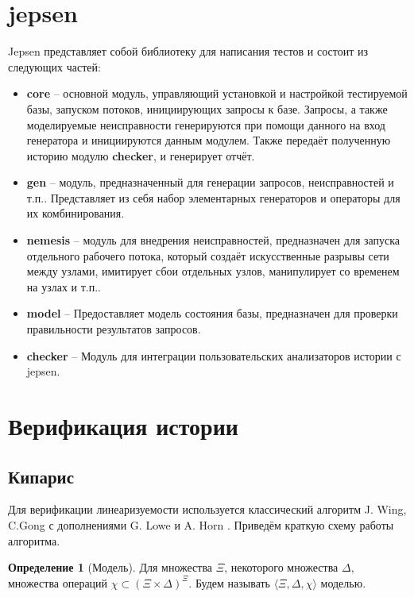 \documentclass[pdftex,ptm,14pt,a4paper]{extreport}
\theoremstyle{definition}
\newtheorem{definition}{Определение}[chapter]
\begin{document}
\section{jepsen}
Jepsen представляет собой библиотеку для написания тестов и состоит из следующих частей:
\begin{itemize}
    \item \textbf{core} -- основной модуль, управляющий установкой и настройкой тестируемой базы,
        запуском потоков, инициирующих запросы к базе. Запросы, а также моделируемые неисправности
        генерируются при помощи данного на вход  генератора и инициируются данным модулем.
        Также передаёт полученную историю модулю \textbf{checker}, и генерирует отчёт.
    \item \textbf{gen} -- модуль, предназначенный для генерации запросов, неисправностей и т.п..
        Представляет из себя набор элементарных генераторов и операторы для их комбинирования.
    \item \textbf{nemesis} -- модуль для внедрения неисправностей, предназначен для запуска
        отдельного рабочего потока, который создаёт искусственные разрывы сети между узлами,
        имитирует сбои отдельных узлов, манипулирует со временем на узлах и т.п..
    \item \textbf{model} -- Предоставляет модель состояния базы, предназначен для проверки правильности результатов запросов.
    \item \textbf{checker} -- Модуль для интеграции пользовательских анализаторов истории с jepsen.
\end{itemize}
\section{Верификация истории}
\subsection{Кипарис}
\label{cypress-verify}
Для верификации линеаризуемости используется классический алгоритм J. Wing, C.Gong \cite{wing-testing}
с дополнениями G. Lowe \cite{lowe-testing} и A. Horn \cite{horn-faster}.
Приведём краткую схему работы алгоритма.
\begin{definition}[Модель]
    Для множества $\Xi$, некоторого множества $\Delta,$ множества операций $\chi \subset (\Xi \times \Delta)^\Xi.$
    Будем называть $\langle \Xi, \Delta, \chi \rangle$ моделью.
\end{definition}
\end{document}
